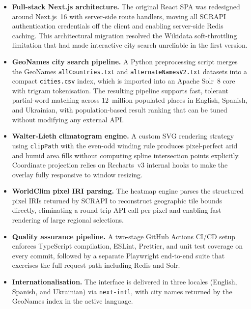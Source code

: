 \begin{itemize}
  \item \textbf{Full-stack Next.js architecture.} The original React SPA was
    redesigned around Next.js~16 with server-side route handlers, moving all
    SCRAPI authentication credentials off the client and enabling server-side
    Redis caching. This architectural migration resolved the Wikidata
    soft-throttling limitation that had made interactive city search unreliable
    in the first version.

  \item \textbf{GeoNames city search pipeline.} A Python preprocessing script
    merges the GeoNames \texttt{allCountries.txt} and
    \texttt{alternateNamesV2.txt} datasets into a compact \texttt{cities.csv}
    index, which is imported into an Apache Solr~8 core with trigram
    tokenisation. The resulting pipeline supports fast, tolerant partial-word
    matching across 12~million populated places in English, Spanish, and
    Ukrainian, with population-based result ranking that can be tuned without
    modifying any external API.

  \item \textbf{Walter-Lieth climatogram engine.} A custom SVG rendering
    strategy using \texttt{clipPath} with the even-odd winding rule produces
    pixel-perfect arid and humid area fills without computing spline
    intersection points explicitly. Coordinate projection relies on
    Recharts~v3 internal hooks to make the overlay fully responsive to window
    resizing.

  \item \textbf{WorldClim pixel IRI parsing.} The heatmap engine parses the
    structured pixel IRIs returned by SCRAPI to reconstruct geographic tile
    bounds directly, eliminating a round-trip API call per pixel and enabling
    fast rendering of large regional selections.

  \item \textbf{Quality assurance pipeline.} A two-stage GitHub Actions CI/CD
    setup enforces TypeScript compilation, ESLint, Prettier, and unit test
    coverage on every commit, followed by a separate Playwright end-to-end
    suite that exercises the full request path including Redis and Solr.

  \item \textbf{Internationalisation.} The interface is delivered in three
    locales (English, Spanish, and Ukrainian) via \texttt{next-intl}, with
    city names returned by the GeoNames index in the active language.
\end{itemize}


